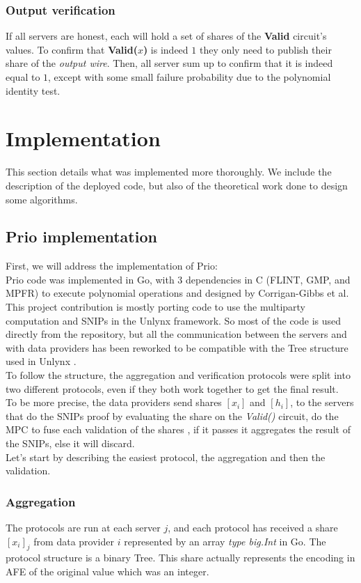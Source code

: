 \documentclass{article}
\begin{document}
\subsubsection{Output verification}
If all servers are honest, each will hold a set of shares of the \textbf{Valid} circuit's values. To confirm that \textbf{Valid($x$)} is indeed $1$ they only need to publish their share of the \textit{output wire}. Then, all server sum up to confirm that it is indeed equal to $1$, except with some small failure probability due to the polynomial identity test.


\section{Implementation}
This section details what was implemented more thoroughly. We include the description of the deployed code, but also of the theoretical work done to design some algorithms.

\subsection{Prio implementation}
First, we will address the implementation of Prio:\\

Prio code \cite{priocode} was implemented in Go, with 3 dependencies in C (FLINT, GMP, and MPFR) to execute polynomial operations and designed by Corrigan-Gibbs et al.\\
This project contribution is mostly porting code to use the multiparty computation and SNIPs in the Unlynx framework. So most of the code is used directly from the repository, but all the communication between the servers and with data providers has been reworked to be compatible with the Tree structure used in Unlynx \cite{unlynxcode}.\\
To follow the structure, the aggregation and verification protocols were split into two different protocols, even if they both work together to get the final result.\\
To be more precise, the data providers send shares $[x_i]$ and $[h_i]$, to the servers that do the SNIPs proof by evaluating the share on the \textit{Valid()} circuit, do the MPC to fuse each validation of the shares , if it passes it aggregates the result of the SNIPs, else it will discard.\\
Let's start by describing the easiest protocol, the aggregation and then the validation.\\
\subsubsection*{Aggregation}
The protocols are run at each server $j$, and each protocol has received a share $[x_i]_j$ from data provider $i$ represented by an array \textit{type big.Int} in Go. The protocol structure is a binary Tree.
This share actually represents the encoding in AFE of the original value which was an integer.\\
\end{document}
